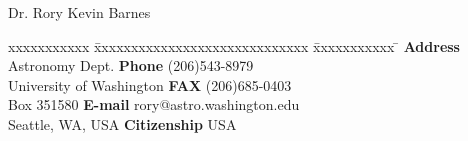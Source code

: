 \documentclass[12pt]{article}
\begin{document}
\newpage
\begin{center}
\LARGE
{Dr. Rory Kevin Barnes\\}
\normalsize
\end{center}

\begin{tabbing}
xxxxxxxxxxx \= xxxxxxxxxxxxxxxxxxxxxxxxxxxxx \= xxxxxxxxxxx \=    \kill
{\bf Address} \> Astronomy Dept. \> {\bf Phone} \>
(206)543-8979\\
                \> University of Washington \> {\bf FAX} \> (206)685-0403\\
                \> Box 351580 \> {\bf E-mail} \> rory@astro.washington.edu\\
                \> Seattle, WA, USA \> {\bf Citizenship} \>USA
\end{tabbing}
\end{document}
